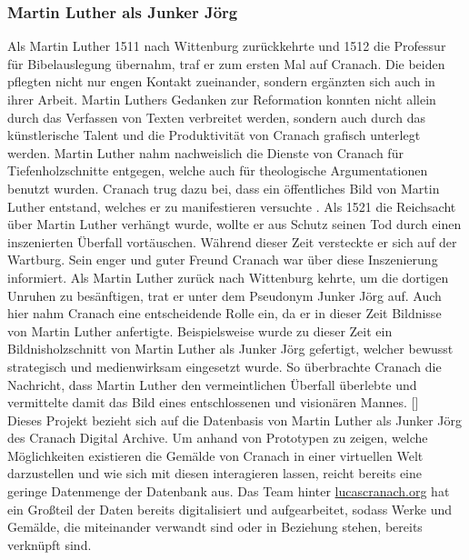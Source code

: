 \documentclass[a4paper,12pt,oneside]{article}
\begin{document}
    \subsubsection{Martin Luther als Junker Jörg}
      Als Martin Luther 1511 nach Wittenburg zurückkehrte und 1512 die Professur für
      Bibelauslegung übernahm, traf er zum ersten Mal auf Cranach.
      Die beiden pflegten nicht nur engen Kontakt zueinander, sondern ergänzten sich auch
      in ihrer Arbeit. Martin Luthers Gedanken zur Reformation konnten
      nicht allein durch das Verfassen von Texten verbreitet werden, sondern auch durch 
      das künstlerische Talent und die
      Produktivität von Cranach grafisch unterlegt werden. 
      Martin Luther nahm nachweislich die Dienste von 
      Cranach für Tiefenholzschnitte entgegen, welche auch für
      theologische Argumentationen benutzt wurden. Cranach trug
      dazu bei, dass ein öffentliches Bild von Martin Luther entstand, welches
      er zu manifestieren versuchte . Als 1521 die Reichsacht über 
      Martin Luther verhängt wurde, 
      wollte er aus Schutz seinen Tod durch einen inszenierten Überfall vortäuschen.
      Während dieser Zeit versteckte er sich auf der Wartburg.
      Sein enger und guter Freund Cranach war über diese Inszenierung 
      informiert. 
      Als Martin Luther zurück nach Wittenburg kehrte, um die dortigen Unruhen zu besänftigen, 
      trat er unter dem Pseudonym \glqq Junker Jörg\grqq{} auf. 
      Auch hier nahm Cranach eine entscheidende Rolle ein, da er in dieser 
      Zeit Bildnisse von Martin Luther anfertigte. 
      Beispielsweise wurde zu dieser Zeit ein Bildnisholzschnitt
      von Martin Luther als Junker Jörg gefertigt, welcher bewusst strategisch und
      medienwirksam eingesetzt wurde. So überbrachte Cranach die Nachricht, dass Martin Luther
      den vermeintlichen Überfall überlebte und vermittelte damit das Bild eines 
      entschlossenen und visionären Mannes. [\cite{heydenreich2017lucas}] \\
      Dieses Projekt bezieht sich auf die Datenbasis von Martin Luther als
      Junker Jörg des Cranach Digital Archive. 
      Um anhand von Prototypen zu zeigen, welche Möglichkeiten existieren die
      Gemälde von Cranach in einer virtuellen Welt darzustellen und wie sich mit diesen
      interagieren lassen, reicht bereits eine geringe Datenmenge der Datenbank
      aus.
      Das Team hinter \url{lucascranach.org} hat ein Großteil der Daten bereits
      digitalisiert und aufgearbeitet, sodass Werke und Gemälde, die miteinander
      verwandt sind oder in Beziehung stehen, bereits verknüpft sind.
\end{document}

